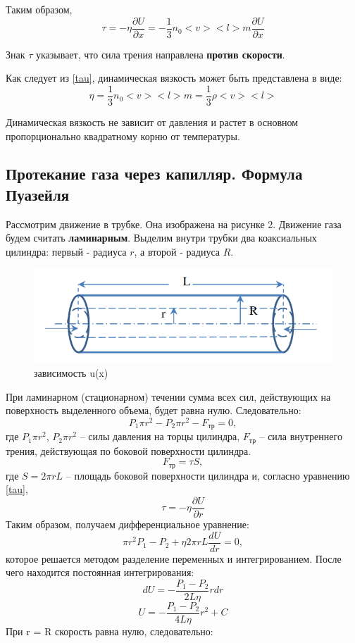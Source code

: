 \documentclass[a4paper,12pt]{article}
\begin{document}
Таким образом, 
\begin{equation}\label{tau}
\tau = -\eta\frac{\partial U}{\partial x} = -\frac{1}{3}n_0<v><l>m\frac{\partial U}{\partial x}
\end{equation}

Знак $\tau$ указывает, что сила трения направлена \textbf{против скорости}.

Как следует из \eqref{tau}, динамическая вязкость может быть представлена в виде:
\begin{equation}\label{tau}
\eta = \frac{1}{3}n_0<v><l>m = \frac{1}{3}\rho<v><l>
\end{equation}

Динамическая вязкость не зависит от давления и растет в основном пропорционально квадратному корню от температуры.

\newpage
\subsection{Протекание газа через капилляр. Формула Пуазейля}
Рассмотрим движение в трубке. Она изображена на рисунке 2. Движение газа будем считать \textbf{ламинарным}. Выделим внутри трубки два коаксиальных цилиндра: первый - радиуса $r$, а второй - радиуса $R$.

\begin{figure}[h!]
	\begin{center}
		\includegraphics[scale=0.7]{2}
	\end{center}
	\caption{зависимость u(x)}
\end{figure}

При ламинарном (стационарном) течении сумма всех сил, действующих на поверхность выделенного объема, будет равна нулю. Следовательно:
$$P_1\pi r^2 - P_2\pi r^2 - F_{тр}= 0,$$
где $P_1\pi r^2$, $P_2\pi r^2$ -- силы давления на торцы цилиндра, $F_{тр}$ -- сила внутреннего трения, действующая по боковой поверхности цилиндра.
$$F_{тр} = \tau S,$$
где $S = 2\pi rL$ -- площадь боковой поверхности цилиндра и, согласно уравнению \eqref{tau},
$$\tau = -\eta\frac{\partial U}{\partial r}$$
Таким образом, получаем дифференциальное уравнение:
$$\pi r^2P_1 - P_2 + \eta2\pi rL\frac{dU}{dr} = 0,$$
которое решается методом разделение переменных и интегрированием. После чего находится постоянная интегрирования:
$$dU = -\frac{P_1 - P_2}{2L\eta}rdr$$
$$U = -\frac{P_1 - P_2}{4L\eta}r^2 + C$$
При r = R скорость равна нулю, следовательно:
\end{document}
